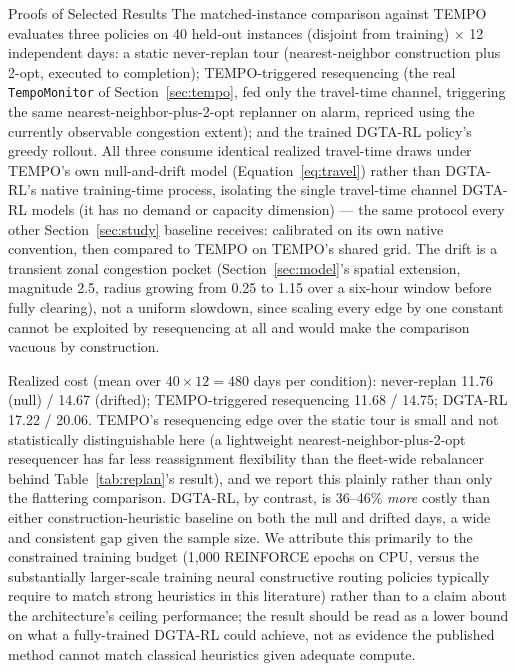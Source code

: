 \documentclass[trsc,dblanonrev]{informs4}
\begin{document}
\begin{APPENDIX}{Proofs of Selected Results}
The matched-instance comparison against TEMPO evaluates three policies
on 40 held-out instances (disjoint from training) $\times$ 12
independent days: a static never-replan tour (nearest-neighbor
construction plus 2-opt, executed to completion); TEMPO-triggered
resequencing (the real \texttt{TempoMonitor} of
Section~\ref{sec:tempo}, fed only the travel-time channel, triggering
the same nearest-neighbor-plus-2-opt replanner on alarm, repriced using
the currently observable congestion extent); and the trained DGTA-RL
policy's greedy rollout. All three consume identical realized
travel-time draws under TEMPO's own null-and-drift model
(Equation~\eqref{eq:travel}) rather than DGTA-RL's native training-time
process, isolating the single travel-time channel DGTA-RL models (it
has no demand or capacity dimension) --- the same protocol every other
Section~\ref{sec:study} baseline receives: calibrated on its own native
convention, then compared to TEMPO on TEMPO's shared grid. The drift is
a transient zonal congestion pocket (Section~\ref{sec:model}'s spatial
extension, magnitude 2.5, radius growing from 0.25 to 1.15 over a
six-hour window before fully clearing), not a uniform slowdown, since
scaling every edge by one constant cannot be exploited by resequencing
at all and would make the comparison vacuous by construction.

Realized cost (mean over $40 \times 12 = 480$ days per condition):
never-replan 11.76 (null) / 14.67 (drifted); TEMPO-triggered
resequencing 11.68 / 14.75; DGTA-RL 17.22 / 20.06. TEMPO's resequencing
edge over the static tour is small and not statistically distinguishable
here (a lightweight nearest-neighbor-plus-2-opt resequencer has far
less reassignment flexibility than the fleet-wide rebalancer behind
Table~\ref{tab:replan}'s result), and we report this plainly rather
than only the flattering comparison. DGTA-RL, by contrast, is 36--46\%
\emph{more} costly than either construction-heuristic baseline on both
the null and drifted days, a wide and consistent gap given the sample
size. We attribute this primarily to the constrained training budget
(1{,}000 REINFORCE epochs on CPU, versus the substantially larger-scale
training neural constructive routing policies typically require to
match strong heuristics in this literature) rather than to a claim
about the architecture's ceiling performance; the result should be
read as a lower bound on what a fully-trained DGTA-RL could achieve,
not as evidence the published method cannot match classical heuristics
given adequate compute.


\end{APPENDIX}
\end{document}
